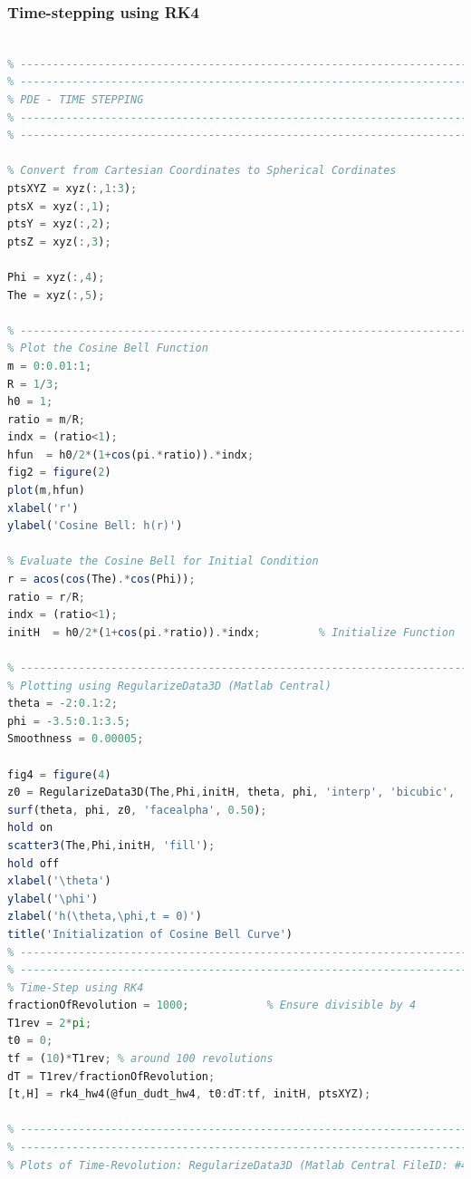 \documentclass[11pt]{article}
\begin{document}
\subsubsection{Time-stepping using RK4}
\begin{lstlisting}[language=octave]

% -------------------------------------------------------------------------
% -------------------------------------------------------------------------
% PDE - TIME STEPPING
% -------------------------------------------------------------------------
% -------------------------------------------------------------------------

% Convert from Cartesian Coordinates to Spherical Cordinates
ptsXYZ = xyz(:,1:3);
ptsX = xyz(:,1);
ptsY = xyz(:,2);
ptsZ = xyz(:,3);

Phi = xyz(:,4);
The = xyz(:,5);

% -------------------------------------------------------------------------
% Plot the Cosine Bell Function
m = 0:0.01:1;
R = 1/3;
h0 = 1;
ratio = m/R;
indx = (ratio<1);
hfun  = h0/2*(1+cos(pi.*ratio)).*indx;
fig2 = figure(2)
plot(m,hfun)
xlabel('r')
ylabel('Cosine Bell: h(r)')

% Evaluate the Cosine Bell for Initial Condition
r = acos(cos(The).*cos(Phi));
ratio = r/R;
indx = (ratio<1);
initH  = h0/2*(1+cos(pi.*ratio)).*indx;         % Initialize Function

% -------------------------------------------------------------------------
% Plotting using RegularizeData3D (Matlab Central)
theta = -2:0.1:2;
phi = -3.5:0.1:3.5;
Smoothness = 0.00005;

fig4 = figure(4)
z0 = RegularizeData3D(The,Phi,initH, theta, phi, 'interp', 'bicubic', 'smoothness', Smoothness);
surf(theta, phi, z0, 'facealpha', 0.50);
hold on
scatter3(The,Phi,initH, 'fill');
hold off
xlabel('\theta')
ylabel('\phi')
zlabel('h(\theta,\phi,t = 0)')
title('Initialization of Cosine Bell Curve')
% -------------------------------------------------------------------------
% -------------------------------------------------------------------------
% Time-Step using RK4
fractionOfRevolution = 1000;            % Ensure divisible by 4
T1rev = 2*pi;
t0 = 0;
tf = (10)*T1rev; % around 100 revolutions
dT = T1rev/fractionOfRevolution;
[t,H] = rk4_hw4(@fun_dudt_hw4, t0:dT:tf, initH, ptsXYZ);  

% -------------------------------------------------------------------------
% -------------------------------------------------------------------------
% Plots of Time-Revolution: RegularizeData3D (Matlab Central FileID: #46223)


\end{lstlisting}
\end{document}
